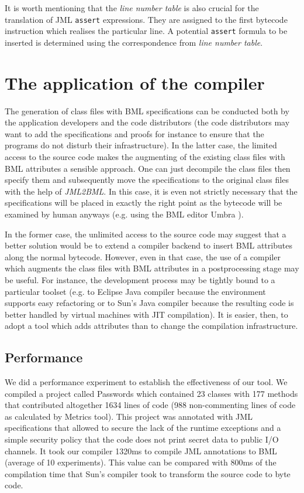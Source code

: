 \documentclass{llncs}
\newcommand{\jmltobmltext}{JML2BML}
\newcommand{\jmltobml}{\textsl{\jmltobmltext}\xspace}
\begin{document}
It is worth mentioning that the \emph{line number table} is also
crucial for the translation of JML \texttt{assert} expressions. They
are assigned to the first bytecode instruction which realises the
particular line. A potential \texttt{assert} formula to be inserted is
determined using the correspondence from \emph{line number table}.

\section{The application of the compiler}

The generation of class files with BML specifications can be conducted
both by the application developers and the code distributors (the code
distributors may want to add the specifications and proofs for
instance to ensure that the programs do not disturb their
infrastructure). In the latter case, the limited access to the source
code makes the augmenting of the existing class files with BML
attributes a sensible approach. One can just decompile the class files
then specify them and subsequently move the specifications to the
original class files with the help of \jmltobml. In this case, it is
even not strictly necessary that the specifications will be placed in
exactly the right point as the bytecode will be examined by human
anyways (e.g. using the BML editor Umbra \cite{bmllib}).

In the former case, the unlimited access to the source code may suggest
that a better solution would be to extend a compiler backend to insert
BML attributes along the normal bytecode. However, even in that case,
the use of a compiler which augments the class files with BML
attributes in a postprocessing stage may be useful. For
instance, the development process may be tightly bound to a particular
toolset (e.g. to Eclipse Java compiler because the environment
supports easy refactoring or to Sun's Java compiler because the
resulting code is better handled by virtual machines with JIT
compilation). It is easier, then, to adopt a tool which
adds attributes than to change the compilation infrastructure.

\subsection{Performance}

We did a performance experiment to establish the effectiveness
of our tool. We compiled a project called Passwords which contained 23
classes with 177 methods that contributed altogether 1634 lines of
code (988 non-commenting lines of code as calculated by Metrics tool).
This project was annotated with JML specifications that allowed to
secure the lack of the runtime exceptions and a simple security policy
that the code does not print secret data to public I/O channels.  It
took our compiler 1320ms to compile JML annotations to BML
(average of 10 experiments). This value can be compared with 800ms of
the compilation time that Sun's compiler took to transform the source
code to byte code.
\end{document}
